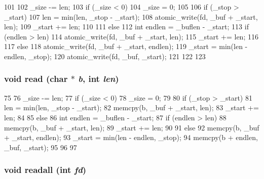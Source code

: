 \begin{DoxyCode}
101 {
102     _size -= len;
103     if (_size < 0)
104         _size = 0;
105 
106     if (_stop > _start) {
107         len = min(len, _stop - _start);
108         atomic_write(fd, _buf + _start, len);
109         _start += len;
110     }
111     else {
112         int endlen = _buflen - _start;
113         if (endlen > len) {
114             atomic_write(fd, _buf + _start, len);
115             _start += len;
116         }
117         else {
118             atomic_write(fd, _buf + _start, endlen);
119             _start = min(len - endlen, _stop);
120             atomic_write(fd, _buf, _start);
121         }
122     }
123 }
\end{DoxyCode}
\hypertarget{classCircleBuf_a208ffb7fc988270a34244c2004d9a6e2}{
\subsubsection[{read}]{\setlength{\rightskip}{0pt plus 5cm}void read (char $\ast$ {\em b}, \/  int {\em len})}}
\label{classCircleBuf_a208ffb7fc988270a34244c2004d9a6e2}



\begin{DoxyCode}
75 {
76     _size -= len;
77     if (_size < 0)
78         _size = 0;
79 
80     if (_stop > _start) {
81         len = min(len, _stop - _start);
82         memcpy(b, _buf + _start, len);
83         _start += len;
84     }
85     else {
86         int endlen = _buflen - _start;
87         if (endlen > len) {
88             memcpy(b, _buf + _start, len);
89             _start += len;
90         }
91         else {
92             memcpy(b, _buf + _start, endlen);
93             _start = min(len - endlen, _stop);
94             memcpy(b + endlen, _buf, _start);
95         }
96     }
97 }
\end{DoxyCode}
\hypertarget{classCircleBuf_a3c78951b2792a613e4cff9194ced196c}{
\subsubsection[{readall}]{\setlength{\rightskip}{0pt plus 5cm}void readall (int {\em fd})}}
\label{classCircleBuf_a3c78951b2792a613e4cff9194ced196c}



